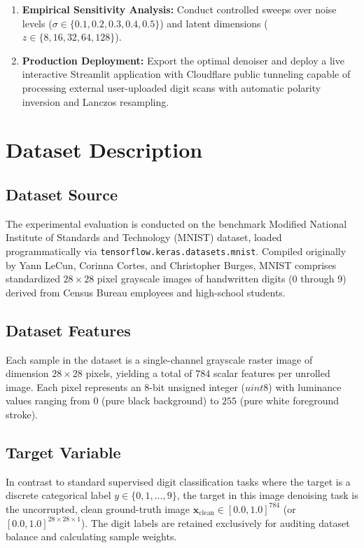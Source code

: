 \documentclass[12pt, a4paper]{article}
\begin{document}
\begin{enumerate}[label=\textbf{\arabic*.}]
    \item \textbf{Empirical Sensitivity Analysis:} Conduct controlled sweeps over noise levels ($\sigma \in \{0.1, 0.2, 0.3, 0.4, 0.5\}$) and latent dimensions ($z \in \{8, 16, 32, 64, 128\}$).
    \item \textbf{Production Deployment:} Export the optimal denoiser and deploy a live interactive Streamlit application with Cloudflare public tunneling capable of processing external user-uploaded digit scans with automatic polarity inversion and Lanczos resampling.
\end{enumerate}


\section{Dataset Description}

\subsection{Dataset Source}
The experimental evaluation is conducted on the benchmark Modified National Institute of Standards and Technology (MNIST) dataset, loaded programmatically via \texttt{tensorflow.keras.datasets.mnist}. Compiled originally by Yann LeCun, Corinna Cortes, and Christopher Burges, MNIST comprises standardized $28 \times 28$ pixel grayscale images of handwritten digits (0 through 9) derived from Census Bureau employees and high-school students.

\subsection{Dataset Features}
Each sample in the dataset is a single-channel grayscale raster image of dimension $28 \times 28$ pixels, yielding a total of $784$ scalar features per unrolled image. Each pixel represents an 8-bit unsigned integer ($uint8$) with luminance values ranging from $0$ (pure black background) to $255$ (pure white foreground stroke).

\subsection{Target Variable}
In contrast to standard supervised digit classification tasks where the target is a discrete categorical label $y \in \{0, 1, \dots, 9\}$, the target in this image denoising task is the uncorrupted, clean ground-truth image $\mathbf{x}_{\text{clean}} \in [0.0, 1.0]^{784}$ (or $[0.0, 1.0]^{28 \times 28 \times 1}$). The digit labels are retained exclusively for auditing dataset balance and calculating sample weights.
\end{document}
